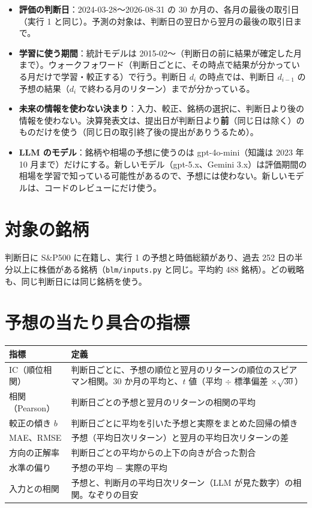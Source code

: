 \documentclass[xelatex,ja=standard,jafont=haranoaji,a4paper,10pt,openany]{bxjsreport}
\newcommand{\code}[1]{\texttt{#1}}
\newcommand{\SP}{S\&P500}
\begin{document}
\begin{itemize}
\item \textbf{評価の判断日}：2024-03-28〜2026-08-31 の 30 か月の、各月の最後の取引日（実行 1 と同じ）。予測の対象は、判断日の翌日から翌月の最後の取引日まで。
\item \textbf{学習に使う期間}：統計モデルは 2015-02〜（判断日の前に結果が確定した月まで）。ウォークフォワード（判断日ごとに、その時点で結果が分かっている月だけで学習・較正する）で行う。判断日 $d_i$ の時点では、判断日 $d_{i-1}$ の予想の結果（$d_i$ で終わる月のリターン）までが分かっている。
\item \textbf{未来の情報を使わない決まり}：入力、較正、銘柄の選択に、判断日より後の情報を使わない。決算発表文は、提出日が判断日より\textbf{前}（同じ日は除く）のものだけを使う（同じ日の取引終了後の提出がありうるため）。
\item \textbf{LLM のモデル}：銘柄や相場の予想に使うのは gpt-4o-mini（知識は 2023 年 10 月まで）だけにする。新しいモデル（gpt-5.x、Gemini 3.x）は評価期間の相場を学習で知っている可能性があるので、予想には使わない。新しいモデルは、コードのレビューにだけ使う。
\end{itemize}

\section{対象の銘柄}

判断日に \SP{} に在籍し、実行 1 の予想と時価総額があり、過去 252 日の半分以上に株価がある銘柄（\code{blm/inputs.py} と同じ。平均約 488 銘柄）。どの戦略も、同じ判断日には同じ銘柄を使う。

\section{予想の当たり具合の指標}

\begin{longtable}{p{3.6cm}p{11.3cm}}
\toprule
\textbf{指標} & \textbf{定義} \\
\midrule
\endfirsthead
\bottomrule
\endfoot
IC（順位相関） & 判断日ごとに、予想の順位と翌月のリターンの順位のスピアマン相関。30 か月の平均と、$t$ 値（平均 $\div$ 標準偏差 $\times\sqrt{30}$） \\
相関（Pearson） & 判断日ごとの予想と翌月のリターンの相関の平均 \\
較正の傾き $b$ & 判断日ごとに平均を引いた予想と実際をまとめた回帰の傾き \\
MAE、RMSE & 予想（平均日次リターン）と翌月の平均日次リターンの差 \\
方向の正解率 & 判断日ごとの平均からの上下の向きが合った割合 \\
水準の偏り & 予想の平均 $-$ 実際の平均 \\
入力との相関 & 予想と、判断月の平均日次リターン（LLM が見た数字）の相関。なぞりの目安 \\
\end{longtable}
\end{document}
